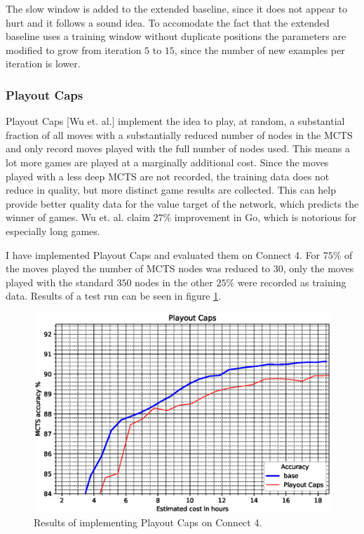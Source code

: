 \documentclass[12pt,onecolumn,oneside,titlepage]{article}
\begin{document}
The slow window is added to the extended baseline, since it does not appear to hurt and it follows a sound idea. To accomodate the fact that the extended baseline uses a training window without duplicate positions the parameters are modified
to grow from iteration $5$ to $15$, since the number of new examples per iteration is lower.

\subsubsection{Playout Caps}

Playout Caps \cite{wu2019accelerating}[Wu et. al.] implement the idea to play, at random, a substantial fraction of all moves with a substantially reduced number of nodes in the MCTS and only record moves played with the full number of nodes used.
This means a lot more games are played at a marginally additional cost. Since the moves played with a less deep MCTS are not recorded, the training data does not reduce in quality, but more distinct game results are collected.
This can help provide better quality data for the value target of the network, which predicts the winner of games. Wu et. al. claim $27\%$ improvement in Go, which is notorious for especially long games.

I have implemented Playout Caps and evaluated them on Connect 4. For $75\%$ of the moves played the number of MCTS nodes was reduced to $30$, only the moves played with the standard $350$ nodes in the other $25\%$ were recorded as training data.
Results of a test run can be seen in figure \ref{fig:playout_caps}.

\begin{figure}[H]
\centering
\includegraphics[clip,width=\columnwidth]{playout_caps}
\caption{Results of implementing Playout Caps on Connect 4.}
\label{fig:playout_caps}
\end{figure}
\end{document}
